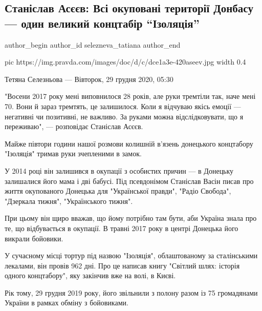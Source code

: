  
 
 
 
 
 
\subsection{Станіслав Асєєв: Всі окуповані території Донбасу — один великий концтабір \enquote{Ізоляція}}
\label{sec:29_12_2020.news.ua.pravda.selezneva_tatiana.1.stanislav_aseev}
\ifcmt
	author_begin
   author_id selezneva_tatiana
	author_end
\fi

\ifcmt
  pic https://img.pravda.com/images/doc/d/c/dce1a3e-420aseev.jpg
	width 0.4
\fi

Тетяна Селезньова — Вівторок, 29 грудня 2020, 05:30

"Восени 2017 року мені виповнилося 28 років, але руки тремтіли так, наче мені
70. Вони й зараз тремтять, це залишилося. Коли я відчуваю якісь емоції —
негативні чи позитивні, не важливо. За руками можна відслідковувати, що я
переживаю", — розповідає Станіслав Асєєв.

Майже півтори години нашої розмови колишній в’язень донецького концтабору
"Ізоляція" тримав руки зчепленими в замок. 

У 2014 році він залишився в окупації з особистих причин — в Донецьку залишалися
його мама і дві бабусі. Під псевдонімом Станіслав Васін писав про життя
окупованого Донецька для "Української правди", "Радіо Свобода", "Дзеркала
тижня", "Українського тижня".

При цьому він щиро вважав, що йому потрібно там бути, аби Україна знала про те,
що відбувається в окупації. В травні 2017 року в центрі Донецька його викрали
бойовики.

У сучасному місці тортур під назвою "Ізоляція", облаштованому за сталінськими
лекалами, він провів 962 дні. Про це написав книгу "Світлий шлях: історія
одного концтабору", яку закінчив вже на волі, в Києві.

Рік тому, 29 грудня 2019 року, його звільнили з полону разом із 75 громадянами
України в рамках обміну з бойовиками.

